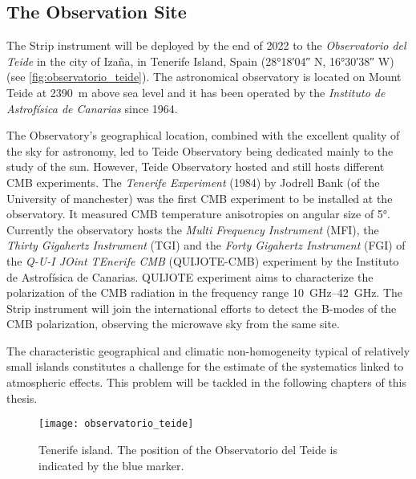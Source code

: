 \subsection{The Observation Site}

The Strip instrument will be deployed by the end of 2022 to the
\emph{Observatorio del Teide} in the city of Iza\~na, in Tenerife Island,
Spain (\ang{28;18;04} N, \ang{16;30;38} W) (see
\autoref{fig:observatorio_teide}). The astronomical observatory is located
on Mount Teide at \SI{2390}{\meter} above sea level and it has been
operated by the \emph{Instituto de Astrof\'isica de Canarias} since 1964.

The Observatory's geographical location, combined with the excellent
quality of the sky for astronomy, led to Teide Observatory being dedicated
mainly to  the study of the sun. However, Teide Observatory hosted and
still hosts different CMB experiments.
The \emph{Tenerife Experiment} (1984) by Jodrell Bank (of the University of
manchester) was the first CMB experiment to be installed at the
observatory. It measured CMB temperature anisotropies on angular size of
\ang{5}. Currently the observatory hosts the \emph{Multi Frequency
Instrument} (MFI), the \emph{Thirty Gigahertz Instrument} (TGI) and the
\emph{Forty Gigahertz Instrument} (FGI) of the \emph{Q-U-I JOint TEnerife
CMB} (QUIJOTE-CMB) experiment by the Instituto de Astrof\'isica de
Canarias. QUIJOTE experiment aims to characterize the
polarization of the CMB radiation in the frequency range
\SIrange{10}{42}{\giga\hertz}. The Strip instrument will join the
international efforts to detect the B-modes of the CMB polarization,
observing the microwave sky from the same site.

The characteristic geographical and climatic non-homogeneity typical of
relatively small islands constitutes a challenge for the estimate of the
systematics linked to atmospheric effects. This problem will be tackled in
the following chapters of this thesis.


\begin{figure}
        \centering
        \texttt{[image: observatorio\_teide]}
        \caption{Tenerife island. The position of the Observatorio del
        Teide is indicated by the blue marker.}
        \label{fig:observatorio_teide}
\end{figure}


